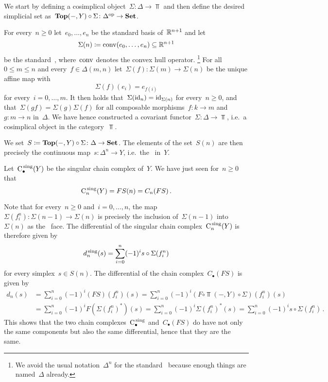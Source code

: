 \subsection{}

We start by defining a cosimplical object~$\Sigma \colon \Delta \to \Top$ and then define the desired simplicial set as~$\mathbf{Top}(-,Y) \circ \Sigma \colon \Delta^{\mathrm{op}} \to \mathbf{Set}$.

For every~$n \geq 0$ let~$e_0, \dotsc, e_n$ be the standard basis of~$\mathbb{R}^{n+1}$ and let
\[
  \Sigma (n)
  \coloneqq
  \operatorname{conv}(e_0, \dotsc, e_n)
  \subseteq
  \mathbb{R}^{n+1}
\]
be the standard~, where~$\operatorname{conv}$ denotes the convex hull operator.%
\footnote{We avoid the usual notation~$\Delta^n$ for the standard~ because enough things are named~$\Delta$ already.}
For all~$0 \leq m \leq n$ and every~$f \in \Delta(m,n)$ let~$\Sigma(f) \colon \Sigma(m) \to \Sigma(n)$ be the unique affine map with
\[
    \Sigma(f)(e_i)
  = e_{f(i)}
\]
for every~$i = 0, \dotsc, m$.
It then holds that~$\Sigma(\operatorname{id}_n) = \operatorname{id}_{\Sigma(n)}$ for every~$n \geq 0$, and that~$\Sigma(gf) = \Sigma(g) \Sigma(f)$ for all composable morphisms~$f \colon k \to m$ and~$g \colon m \to n$ in~$\Delta$.
We have hence constructed a covariant functor~$\Sigma \colon \Delta \to \Top$, i.e.\ a cosimplical object in the category~$\Top$.

We set~$S \coloneqq \mathbf{Top}(-,Y) \circ \Sigma \colon \Delta \to \mathbf{Set}$.
The elements of the set~$S(n)$ are then precisely the continuous map~$s \colon \Delta^n \to Y$, i.e.\ the~ in~$Y$.

Let~$\operatorname{C}^{\,\mathrm{sing}}_\bullet(Y)$ be the singular chain complex of~$Y$.
We have just seen for~$n \geq 0$ that
\[
    \operatorname{C}^{\,\mathrm{sing}}_n(Y)
  = FS(n)
  = C_n(FS) \,.
\]

Note that for every~$n \geq 0$ and~$i = 0, \dotsc, n$, the map~$\Sigma(f^n_i) \colon \Sigma(n-1) \to \Sigma(n)$ is precisely the inclusion of~$\Sigma(n-1)$ into~$\Sigma(n)$ as the~ face.
The differential of the singular chain complex~$\operatorname{C}^{\,\mathrm{sing}}_n(Y)$ is therefore given by
\[
    d^{\,\mathrm{sing}}_n(s)
  = \sum_{i=0}^n (-1)^i s \circ \Sigma(f^n_i)
\]
for every simplex~$s \in S(n)$.
The differential of the chain complex~$C_\bullet(FS)$ is given by
\begin{align*}
      d_n(s)
  &=  \sum_{i=0}^n (-1)^i (FS)(f^n_i)(s)
   =  \sum_{i=0}^n (-1)^i (F \circ \Top(-,Y) \circ \Sigma)(f^n_i)(s)  \\
  &=  \sum_{i=0}^n (-1)^i F( \Sigma(f^n_i)^* )(s)
   =  \sum_{i=0}^n (-1)^i \Sigma(f^n_i)^*(s)
   =  \sum_{i=0}^n (-1)^i s \circ \Sigma(f^n_i) \,.
\end{align*}
This shows that the two chain complexes~$\operatorname{C}^{\,\mathrm{sing}}_\bullet$ and~$C_\bullet(FS)$ do have not only the same components but also the same differential, hence that they are the same.


